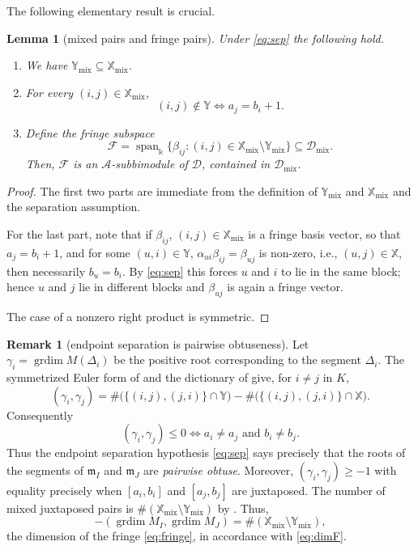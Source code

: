 \documentclass[12pt]{article}
\newtheorem{lemma}[lemma]{Lemma}
\theoremstyle{definition}
\newtheorem{remark}[remark]{Remark}
\newcommand{\mix}{\mathrm{mix}}   %
\newcommand{\grdim}{\operatorname{grdim}}
\newcommand{\mm}{\mathfrak{m}}
\newcommand{\kk}{\Bbbk}
\newcommand{\alg}{\mathcal{A}}   %
\newcommand{\bmdl}{\mathcal{D}}   %
\newcommand{\XX}{\mathbb{X}}  %
\newcommand{\YY}{\mathbb{Y}}  %
\newcommand{\Kk}{K}         %
\newcommand{\algbss}{\alpha}     %
\newcommand{\bmdlbss}{\beta}    %
\newcommand{\Ff}{\mathcal{F}}   %
\newcommand{\Span}{\operatorname{span}}
\begin{document}
The following elementary result is crucial.
\begin{lemma}[mixed pairs and fringe pairs]\label{lem:mixed}
Under \eqref{eq:sep} the following hold.
\begin{enumerate}
\item\label{mix:incl} We have $\YY_{\mix} \subseteq\XX_{\mix}$.
\item\label{mix:adj} For every $(i,j) \in \XX_{\mix}$,
\[
   (i,j) \notin \YY \iff a_j = b_i + 1 .
\]
\item \label{lem:fringe} Define the \emph{fringe subspace}
\begin{equation}\label{eq:fringe}
   \Ff = \Span_\kk\{\bmdlbss_{ij} : (i,j) \in \XX_{\mix}\setminus
   \YY_{\mix}\} \subseteq \bmdl_{\mix} .
\end{equation}
Then, $\Ff$ is an $\alg$-subbimodule of $\bmdl$, contained in $\bmdl_{\mix}$.
\end{enumerate}
\end{lemma}


\begin{proof}
The first two parts are immediate from the definition of $\YY_{\mix}$ and $\XX_{\mix}$ and the separation assumption.

For the last part, note that if $\bmdlbss_{ij}$, $(i,j)\in\XX_{\mix}$ is a fringe basis vector, so that $a_j = b_i + 1$,
and for some $(u,i) \in \YY$, $\algbss_{ui}\bmdlbss_{ij} =\bmdlbss_{uj}$ is non-zero, i.e.,  $(u,j) \in \XX$,
then necessarily $b_u=b_i$.
By \eqref{eq:sep} this forces $u$ and $i$ to
lie in the same block; hence $u$ and $j$ lie in different blocks and $\bmdlbss_{uj}$ is again a fringe vector.

The case of a nonzero right product is symmetric.
\end{proof}

\begin{remark}[endpoint separation is pairwise obtuseness]\label{rem:obtusepairs}
Let $\gamma_i = \grdim M(\Delta_i)$ be the positive root corresponding to the segment $\Delta_i$.
The symmetrized Euler form of  and the dictionary of
 give, for $i \ne j$ in $\Kk$,
\begin{equation}\label{eq:pairform}
   (\gamma_i,\gamma_j) = \#\bigl(\{(i,j),(j,i)\}\cap \YY\bigr) -
   \#\bigl(\{(i,j),(j,i)\}\cap \XX\bigr) .
\end{equation}
Consequently
\[
   (\gamma_i,\gamma_j) \le 0
   \iff
   a_i \ne a_j \text{ and } b_i \ne b_j .
\]
Thus the endpoint separation hypothesis \eqref{eq:sep} says precisely
that the roots of the segments of $\mm_I$ and $\mm_J$ are \emph{pairwise obtuse}.
Moreover, $(\gamma_i,\gamma_j)\ge-1$ with equality precisely when $[a_i,b_i]$ and $[a_j,b_j]$ are juxtaposed.
The number of mixed juxtaposed pairs is $\#(\XX_{\mix}\setminus \YY_{\mix})$ by .
Thus,
\[
-(\grdim M_I,\grdim M_J) =\#(\XX_{\mix}\setminus \YY_{\mix}),
\]
the dimension of the fringe \eqref{eq:fringe}, in accordance with \eqref{eq:dimF}.
\end{remark}
\end{document}

